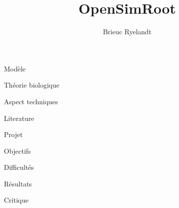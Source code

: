 \documentclass[11pt]{beamer}
\author{Brieuc Ryelandt}
\title{OpenSimRoot}
\begin{document}
\begin{frame}
\titlepage
\end{frame}

\begin{frame}{Modèle}

\end{frame}

\begin{frame}{Théorie biologique}

\end{frame}

\begin{frame}{Aspect techniques}

\end{frame}

\begin{frame}{Literature}

\end{frame}

\begin{frame}{Projet}

\end{frame}

\begin{frame}{Objectifs}

\end{frame}

\begin{frame}{Difficultés}

\end{frame}

\begin{frame}{Résultats}

\end{frame}

\begin{frame}{Critique}

\end{frame}
\end{document}
